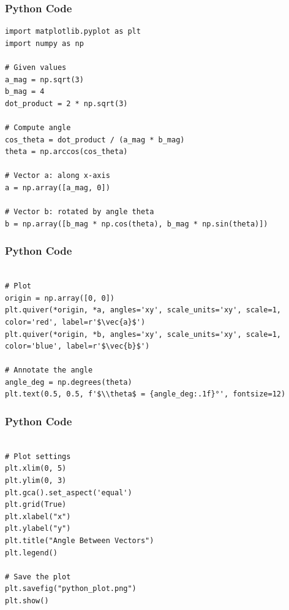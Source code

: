 \documentclass{beamer}
\begin{document}
\begin{frame}[fragile]
    \frametitle{Python Code}
    \begin{lstlisting}
import matplotlib.pyplot as plt
import numpy as np

# Given values
a_mag = np.sqrt(3)
b_mag = 4
dot_product = 2 * np.sqrt(3)

# Compute angle
cos_theta = dot_product / (a_mag * b_mag)
theta = np.arccos(cos_theta)

# Vector a: along x-axis
a = np.array([a_mag, 0])

# Vector b: rotated by angle theta
b = np.array([b_mag * np.cos(theta), b_mag * np.sin(theta)])

    \end{lstlisting}
\end{frame}

\begin{frame}[fragile]
    \frametitle{Python Code}
    \begin{lstlisting}

# Plot
origin = np.array([0, 0])
plt.quiver(*origin, *a, angles='xy', scale_units='xy', scale=1, color='red', label=r'$\vec{a}$')
plt.quiver(*origin, *b, angles='xy', scale_units='xy', scale=1, color='blue', label=r'$\vec{b}$')

# Annotate the angle
angle_deg = np.degrees(theta)
plt.text(0.5, 0.5, f'$\\theta$ = {angle_deg:.1f}°', fontsize=12)
    \end{lstlisting}
\end{frame}

\begin{frame}[fragile]
    \frametitle{Python Code}
    \begin{lstlisting}

# Plot settings
plt.xlim(0, 5)
plt.ylim(0, 3)
plt.gca().set_aspect('equal')
plt.grid(True)
plt.xlabel("x")
plt.ylabel("y")
plt.title("Angle Between Vectors")
plt.legend()

# Save the plot
plt.savefig("python_plot.png")
plt.show()

    \end{lstlisting}
\end{frame}
\end{document}
